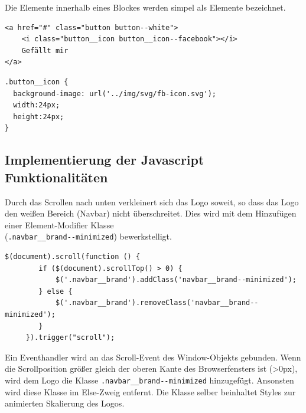 Die Elemente innerhalb eines Blockes werden simpel als Elemente bezeichnet.

\begin{figure}[ht]

\end{figure}

\begin{lstlisting}[style=htmlcssjs, backgroundcolor = \color{lightgray},
caption=BEM -- Block mit Element (HTML)]
<a href="#" class="button button--white">
	<i class="button__icon button__icon--facebook"></i>
	Gefällt mir
</a>
\end{lstlisting}

\begin{lstlisting}[style=htmlcssjs, backgroundcolor = \color{lightgray},
caption=BEM -- Element (CSS)]
.button__icon {
  background-image: url('../img/svg/fb-icon.svg');
  width:24px;
  height:24px;
}
\end{lstlisting}


\subsection{Implementierung der Javascript Funktionalitäten}
\label{sec:ImplementierungJS}
Durch das Scrollen nach unten verkleinert sich das Logo soweit, so dass das
Logo  den weißen Bereich (Navbar) nicht überschreitet. Dies wird mit dem
Hinzufügen einer Element-Modifier Klasse \\
(\lstinline{.navbar__brand--minimized}) bewerkstelligt.
\\
\begin{lstlisting}[style=htmlcssjs, backgroundcolor = \color{lightgray},
caption=Logominimierung beim Scrollen]
    $(document).scroll(function () {
        if ($(document).scrollTop() > 0) {
            $('.navbar__brand').addClass('navbar__brand--minimized');
        } else {
            $('.navbar__brand').removeClass('navbar__brand--minimized');
        }
     }).trigger("scroll");     
\end{lstlisting}

Ein Eventhandler wird an das Scroll-Event des Window-Objekts gebunden.
Wenn die Scrollposition größer gleich der oberen Kante des Browserfensters ist
(>0px), wird dem Logo die Klasse \lstinline{.navbar__brand--minimized}
hinzugefügt. Ansonsten wird diese Klasse im Else-Zweig entfernt.
Die Klasse selber beinhaltet Styles zur animierten Skalierung des Logos.

